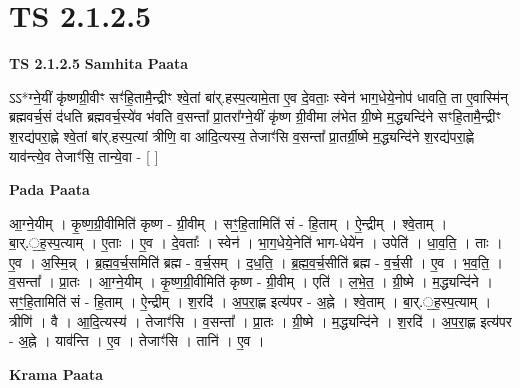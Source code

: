 \documentclass[17pt]{extarticle}
\begin{document}
\section{ TS 2.1.2.5 }

\textbf{TS 2.1.2.5 } \newline
\textbf{Samhita Paata} \newline

ऽऽ*ग्ने॒यीं कृ॑ष्णग्री॒वीꣳ सꣳ॑हि॒तामै॒न्द्रीꣳ श्वे॒तां बा॑र्.हस्प॒त्यामे॒ता ए॒व दे॒वताः॒ स्वेन॑ भाग॒धेये॒नोप॑ धावति॒ ता ए॒वास्मि॑न् ब्रह्मवर्च॒सं द॑धति ब्रह्मवर्च॒स्ये॑व भ॑वति व॒सन्ता᳚ प्रा॒तरा᳚ग्ने॒यीं कृ॑ष्ण ग्री॒वीमा ल॑भेत ग्री॒ष्मे म॒द्ध्यन्दि॑ने सꣳहि॒तामै॒न्द्रीꣳ श॒रद्य॑परा॒ह्णे श्वे॒तां बा॑र्.हस्प॒त्यां त्रीणि॒ वा आ॑दि॒त्यस्य॒ तेजाꣳ॑सि व॒सन्ता᳚ प्रा॒तर्ग्री॒ष्मे म॒द्ध्यन्दि॑ने श॒रद्य॑परा॒ह्णे याव॑न्त्ये॒व तेजाꣳ॑सि॒ तान्ये॒वा - [  ] \newline

\textbf{Pada Paata} \newline

आ॒ग्ने॒यीम् । कृ॒ष्ण॒ग्री॒वीमिति॑ कृष्ण - ग्री॒वीम् । सꣳ॒॒हि॒तामिति॑ सं - हि॒ताम् । ऐ॒न्द्रीम् । श्वे॒ताम् । बा॒र्.॒ह॒स्प॒त्याम् । ए॒ताः । ए॒व । दे॒वताः᳚ । स्वेन॑ । भा॒ग॒धेये॒नेति॑ भाग-धेये॑न । उपेति॑ । धा॒व॒ति॒ । ताः । ए॒व । अ॒स्मि॒न्न् । ब्र॒ह्म॒व॒र्च॒समिति॑ ब्रह्म - व॒र्च॒सम् । द॒ध॒ति॒ । ब्र॒ह्म॒व॒र्च॒सीति॑ ब्रह्म - व॒र्च॒सी । ए॒व । भ॒व॒ति॒ । व॒सन्ता᳚ । प्रा॒तः । आ॒ग्ने॒यीम् । कृ॒ष्ण॒ग्री॒वीमिति॑ कृष्ण - ग्री॒वीम् । एति॑ । ल॒भे॒त॒ । ग्री॒ष्मे । म॒द्ध्यन्दि॑ने । सꣳ॒॒हि॒तामिति॑ सं - हि॒ताम् । ऐ॒न्द्रीम् । श॒रदि॑ । अ॒प॒रा॒ह्ण इत्य॑पर - अ॒ह्ने । श्वे॒ताम् । बा॒र्.॒ह॒स्प॒त्याम् । त्रीणि॑ । वै । आ॒दि॒त्यस्य॑ । तेजाꣳ॑सि । व॒सन्ता᳚ । प्रा॒तः । ग्री॒ष्मे । म॒द्ध्यन्दि॑ने । श॒रदि॑ । अ॒प॒रा॒ह्ण इत्य॑पर - अ॒ह्ने । याव॑न्ति । ए॒व । तेजाꣳ॑सि । तानि॑ । ए॒व ।  \newline


\textbf{Krama Paata} \newline
\end{document}
